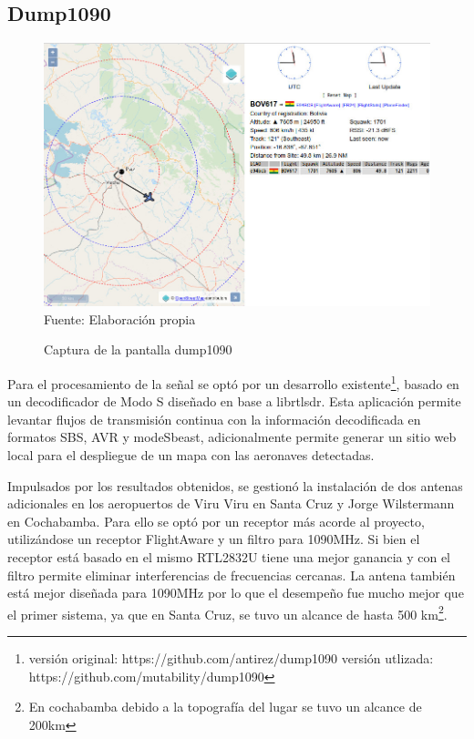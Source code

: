 \documentclass[fleqn,10pt]{SelfArx} %
\begin{document}
\subsection*{Dump1090}

\begin{figure}[ht]
\caption{Captura de la pantalla dump1090}
\centering
\includegraphics[width=0.9\linewidth]{cc0.jpg}
\newline Fuente: Elaboración propia
\label{fig:dump}
\end{figure}

Para el procesamiento de la señal se optó por un desarrollo existente\footnote{versión original: https://github.com/antirez/dump1090 versión utlizada: https://github.com/mutability/dump1090}, basado en un decodificador de Modo S diseñado en base a librtlsdr. Esta aplicación permite levantar flujos de transmisión continua con la información decodificada en formatos SBS, AVR y modeSbeast, adicionalmente permite generar un sitio web local para el despliegue de un mapa con las aeronaves detectadas.



Impulsados por los resultados obtenidos, se gestionó la instalación de dos antenas adicionales en los aeropuertos de Viru Viru en Santa Cruz y Jorge Wilstermann en Cochabamba. Para ello se optó por un receptor más acorde al proyecto, utilizándose un receptor FlightAware y un filtro para 1090MHz. Si bien el receptor está basado en el mismo RTL2832U tiene una mejor ganancia y con el filtro permite eliminar interferencias de frecuencias cercanas. La antena también está mejor diseñada para 1090MHz por lo que el desempeño fue mucho mejor que el primer sistema, ya que en Santa Cruz, se tuvo un alcance de hasta 500 km\footnote{En cochabamba debido a la topografía del lugar se tuvo un alcance de 200km}.
\end{document}
